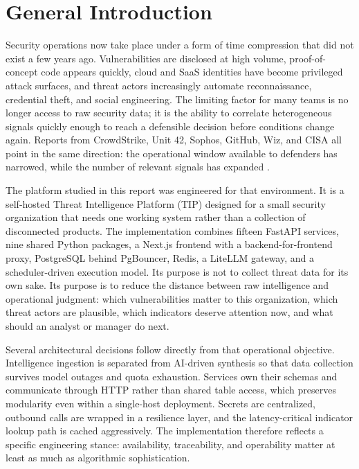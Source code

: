 \chapter*{General Introduction}

Security operations now take place under a form of time compression that did not exist a few years ago. Vulnerabilities are disclosed at high volume, proof-of-concept code appears quickly, cloud and SaaS identities have become privileged attack surfaces, and threat actors increasingly automate reconnaissance, credential theft, and social engineering. The limiting factor for many teams is no longer access to raw security data; it is the ability to correlate heterogeneous signals quickly enough to reach a defensible decision before conditions change again. Reports from CrowdStrike, Unit 42, Sophos, GitHub, Wiz, and CISA all point in the same direction: the operational window available to defenders has narrowed, while the number of relevant signals has expanded \cite{crowdstrike_gtr_2026,unit42_ir_2026,sophos_threat_2025,github_oss_trends_2026,wiz_ai_readiness_2026,cisa_kev}.

The platform studied in this report was engineered for that environment. It is a self-hosted Threat Intelligence Platform (TIP) designed for a small security organization that needs one working system rather than a collection of disconnected products. The implementation combines fifteen FastAPI services, nine shared Python packages, a Next.js frontend with a backend-for-frontend proxy, PostgreSQL behind PgBouncer, Redis, a LiteLLM gateway, and a scheduler-driven execution model. Its purpose is not to collect threat data for its own sake. Its purpose is to reduce the distance between raw intelligence and operational judgment: which vulnerabilities matter to this organization, which threat actors are plausible, which indicators deserve attention now, and what should an analyst or manager do next.

Several architectural decisions follow directly from that operational objective. Intelligence ingestion is separated from AI-driven synthesis so that data collection survives model outages and quota exhaustion. Services own their schemas and communicate through HTTP rather than shared table access, which preserves modularity even within a single-host deployment. Secrets are centralized, outbound calls are wrapped in a resilience layer, and the latency-critical indicator lookup path is cached aggressively. The implementation therefore reflects a specific engineering stance: availability, traceability, and operability matter at least as much as algorithmic sophistication.

